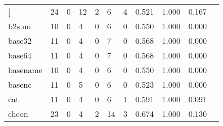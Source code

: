 \begin{longtable}{lp{1.10cm}p{1.10cm}p{1.10cm}p{1.10cm}p{1.10cm}p{1.10cm}p{1.10cm}p{1.10cm}p{1.10cm}p{1.10cm}}
\bottomrule
\endlastfoot
{[}         &                     24 &                                  0 &                                12 &                                2 &                                 6 &                               4 &                          0.521 &                                 1.000 &                               0.167 \\
b2sum     &                     10 &                                  0 &                                 4 &                                0 &                                 6 &                               0 &                          0.550 &                                 1.000 &                               0.000 \\
base32    &                     11 &                                  0 &                                 4 &                                0 &                                 7 &                               0 &                          0.568 &                                 1.000 &                               0.000 \\
base64    &                     11 &                                  0 &                                 4 &                                0 &                                 7 &                               0 &                          0.568 &                                 1.000 &                               0.000 \\
basename  &                     10 &                                  0 &                                 4 &                                0 &                                 6 &                               0 &                          0.550 &                                 1.000 &                               0.000 \\
basenc    &                     11 &                                  0 &                                 5 &                                0 &                                 6 &                               0 &                          0.523 &                                 1.000 &                               0.000 \\
cat       &                     11 &                                  0 &                                 4 &                                0 &                                 6 &                               1 &                          0.591 &                                 1.000 &                               0.091 \\
chcon     &                     23 &                                  0 &                                 4 &                                2 &                                14 &                               3 &                          0.674 &                                 1.000 &                               0.130 \\

\end{longtable}
